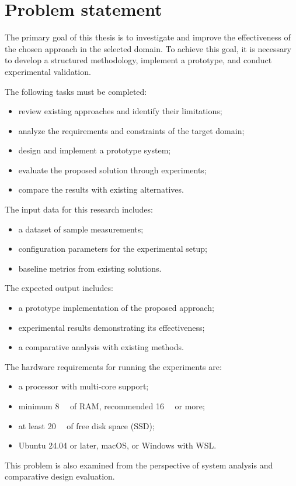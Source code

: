 \section{Problem statement}\label{sec:problem}

The primary goal of this thesis is to investigate and improve the effectiveness of the chosen approach in the selected domain.
To achieve this goal, it is necessary to develop a structured methodology, implement a prototype, and conduct experimental validation.

The following tasks must be completed:
\begin{itemize}
  \item review existing approaches and identify their limitations;
  \item analyze the requirements and constraints of the target domain;
  \item design and implement a prototype system;
  \item evaluate the proposed solution through experiments;
  \item compare the results with existing alternatives.
\end{itemize}

The input data for this research includes:
\begin{itemize}
  \item a dataset of sample measurements;
  \item configuration parameters for the experimental setup;
  \item baseline metrics from existing solutions.
\end{itemize}

The expected output includes:
\begin{itemize}
  \item a prototype implementation of the proposed approach;
  \item experimental results demonstrating its effectiveness;
  \item a comparative analysis with existing methods.
\end{itemize}

The hardware requirements for running the experiments are:
\begin{itemize}
  \item a processor with multi-core support;
  \item minimum \qty{8}{\giga\byte} of RAM, recommended \qty{16}{\giga\byte} or more;
  \item at least \qty{20}{\giga\byte} of free disk space (SSD);
  \item Ubuntu 24.04 or later, macOS, or Windows with WSL.
\end{itemize}

This problem is also examined from the perspective of system analysis and comparative design evaluation.
